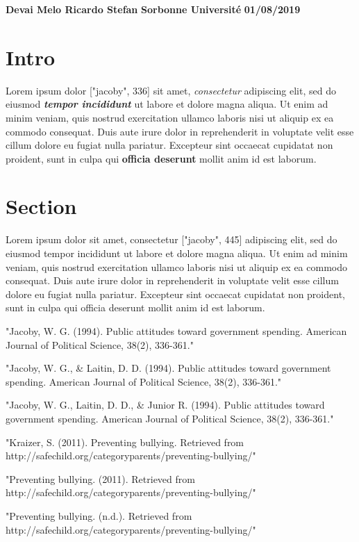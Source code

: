 \documentclass[12pt]{article}
\begin{document}
\begin{flushright}
\textbf{Devai Melo Ricardo Stefan}
\linebreak
\textbf{Sorbonne Université}
\linebreak
\textbf{01/08/2019}
\linebreak
\end{flushright}

\section*{Intro}
Lorem ipsum dolor ["jacoby", 336] sit amet, \emph{consectetur} adipiscing elit, sed do eiusmod \emph{\textbf{tempor incididunt}} ut labore et dolore magna aliqua. Ut enim ad minim veniam, quis nostrud exercitation ullamco laboris nisi ut aliquip ex ea commodo consequat. Duis aute irure dolor in reprehenderit in voluptate velit esse cillum dolore eu fugiat nulla pariatur. Excepteur sint occaecat cupidatat non proident, sunt in culpa qui \textbf{officia deserunt} mollit anim id est laborum.

\section*{Section}
Lorem ipsum dolor sit amet, consectetur ["jacoby", 445] adipiscing elit, sed do eiusmod tempor incididunt ut labore et dolore magna aliqua. Ut enim ad minim veniam, quis nostrud exercitation ullamco laboris nisi ut aliquip ex ea commodo consequat. Duis aute irure dolor in reprehenderit in voluptate velit esse cillum dolore eu fugiat nulla pariatur. Excepteur sint occaecat cupidatat non proident, sunt in culpa qui officia deserunt mollit anim id est laborum.

"Jacoby, W. G. (1994). Public attitudes toward government spending. American Journal of Political Science, 38(2), 336-361."

"Jacoby, W. G., & Laitin, D. D. (1994). Public attitudes toward government spending. American Journal of Political Science, 38(2), 336-361."

"Jacoby, W. G., Laitin, D. D., & Junior R. (1994). Public attitudes toward government spending. American Journal of Political Science, 38(2), 336-361."

"Kraizer, S. (2011). Preventing bullying. Retrieved from http://safechild.org/categoryparents/preventing-bullying/"

"Preventing bullying. (2011). Retrieved from http://safechild.org/categoryparents/preventing-bullying/"

"Preventing bullying. (n.d.). Retrieved from http://safechild.org/categoryparents/preventing-bullying/"
\end{document}
